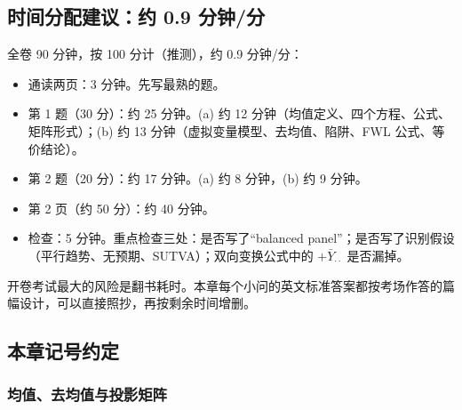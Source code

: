 \subsection{时间分配建议：约 0.9 分钟/分}

全卷 90 分钟，按 100 分计（推测），约 0.9 分钟/分：
\begin{itemize}
  \item 通读两页：3 分钟。先写最熟的题。
  \item 第 1 题（30 分）：约 25 分钟。(a) 约 12 分钟（均值定义、四个方程、公式、矩阵形式）；(b) 约 13 分钟（虚拟变量模型、去均值、陷阱、FWL 公式、等价结论）。
  \item 第 2 题（20 分）：约 17 分钟。(a) 约 8 分钟，(b) 约 9 分钟。
  \item 第 2 页（约 50 分）：约 40 分钟。
  \item 检查：5 分钟。重点检查三处：是否写了“balanced panel”；是否写了识别假设（平行趋势、无预期、SUTVA）；双向变换公式中的 $+\bar Y_{\cdot\cdot}$ 是否漏掉。
\end{itemize}
开卷考试最大的风险是翻书耗时。本章每个小问的英文标准答案都按考场作答的篇幅设计，可以直接照抄，再按剩余时间增删。

\subsection{本章记号约定}

\subsubsection{均值、去均值与投影矩阵}

